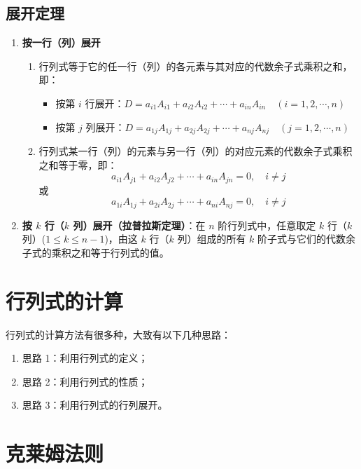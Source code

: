 \documentclass[UTF8]{ctexart}
\theoremstyle{mydef}
\begin{document}
\subsection{展开定理}

\begin{enumerate}
    \item \textbf{按一行（列）展开}
    \begin{enumerate}
        \item 行列式等于它的任一行（列）的各元素与其对应的代数余子式乘积之和，即：
        \begin{itemize}
            \item 按第 $i$ 行展开：$D = a_{i1}A_{i1} + a_{i2}A_{i2} + \cdots + a_{in}A_{in} \quad (i = 1, 2, \cdots, n)$
            \item 按第 $j$ 列展开：$D = a_{1j}A_{1j} + a_{2j}A_{2j} + \cdots + a_{nj}A_{nj} \quad (j = 1, 2, \cdots, n)$
        \end{itemize}
        \item 行列式某一行（列）的元素与另一行（列）的对应元素的代数余子式乘积之和等于零，即：
        $$ a_{i1}A_{j1} + a_{i2}A_{j2} + \cdots + a_{in}A_{jn} = 0, \quad i \neq j $$
        或
        $$ a_{1i}A_{1j} + a_{2i}A_{2j} + \cdots + a_{ni}A_{nj} = 0, \quad i \neq j $$
    \end{enumerate}
    \item \textbf{按 $k$ 行（$k$ 列）展开（拉普拉斯定理）}：在 $n$ 阶行列式中，任意取定 $k$ 行（$k$ 列）($1 \le k \le n-1$)，由这 $k$ 行（$k$ 列）组成的所有 $k$ 阶子式与它们的代数余子式的乘积之和等于行列式的值。
\end{enumerate}

\section{行列式的计算}

行列式的计算方法有很多种，大致有以下几种思路：
\begin{enumerate}
    \item 思路 1：利用行列式的定义；
    \item 思路 2：利用行列式的性质；
    \item 思路 3：利用行列式的行列展开。
\end{enumerate}

\section{克莱姆法则}
\end{document}
